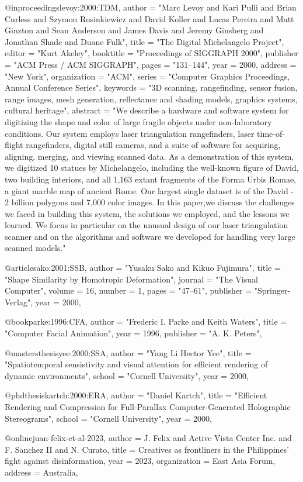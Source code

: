 @inproceedings{levoy:2000:TDM,
  author = "Marc Levoy and Kari Pulli and Brian Curless and Szymon Rusinkiewicz and David Koller and Lucas Pereira and Matt Ginzton and Sean Anderson and James Davis and Jeremy Ginsberg and Jonathan Shade and Duane Fulk",
  title = "The Digital Michelangelo Project",
  editor = "Kurt Akeley",
  booktitle = "Proceedings of SIGGRAPH 2000",
  publisher = "ACM Press / ACM SIGGRAPH",
  pages = "131--144",
  year = 2000,
  address = "New York",
  organization = "ACM",
  series = "Computer Graphics Proceedings, Annual Conference Series",
  keywords = "3D scanning, rangefinding, sensor fusion, range images, mesh generation, reflectance and shading models, graphics systems, cultural heritage",
  abstract = "We describe a hardware and software system for digitizing the
shape and color of large fragile objects under non-laboratory conditions.
Our system employs laser triangulation rangefinders, laser
time-of-flight rangefinders, digital still cameras, and a suite of software
for acquiring, aligning, merging, and viewing scanned data.
As a demonstration of this system, we digitized 10 statues by
Michelangelo, including the well-known figure of David, two building
interiors, and all 1,163 extant fragments of the Forma Urbis
Romae, a giant marble map of ancient Rome. Our largest single
dataset is of the David - 2 billion polygons and 7,000 color images.
In this paper,we discuss the challenges we faced in building this
system, the solutions we employed, and the lessons we learned. We
focus in particular on the unusual design of our laser triangulation
scanner and on the algorithms and software we developed for handling
very large scanned models."
}

@article{sako:2001:SSB,
  author = "Yusaku Sako and Kikuo Fujimura",
  title = "Shape Similarity by Homotropic Deformation",
  journal = "The Visual Computer",
  volume = 16,
  number = 1,
  pages = "47--61",
  publisher = "Springer-Verlag",
  year = 2000,
}

@book{parke:1996:CFA,
  author = "Frederic I. Parke and Keith Waters",
  title = "Computer Facial Animation",
  year = 1996,
  publisher = "A. K. Peters",
}

@mastersthesis{yee:2000:SSA,
  author = "Yang Li Hector Yee",
  title = "Spatiotemporal sensistivity and visual attention for efficient rendering of dynamic environments",
  school = "Cornell University",
  year = 2000,
}

@phdthesis{kartch:2000:ERA,
  author = "Daniel Kartch",
  title = "Efficient Rendering and Compression for Full-Parallax Computer-Generated Holographic Stereograms",
  school = "Cornell University",
  year = 2000,
}

@online{juan-felix-et-al-2023,
  author       = {J. Felix and Active Vista Center Inc. and F. Sanchez II and N. Curato},
  title        = {Creatives as frontliners in the Philippines’ fight against disinformation},
  year         = {2023},
  organization = {East Asia Forum},
  address      = {Australia},
}


